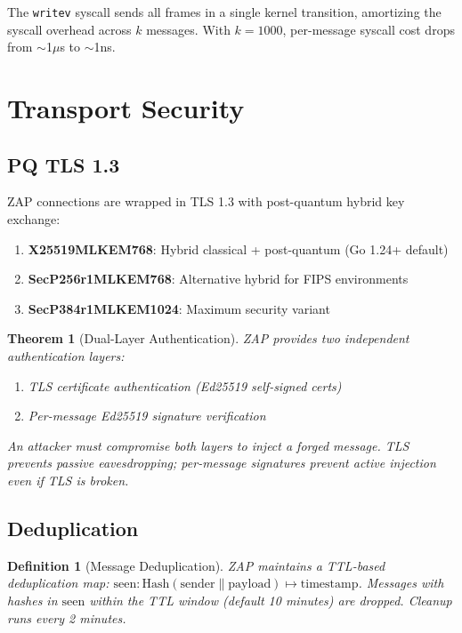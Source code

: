 \documentclass[11pt,letterpaper]{article}
\newtheorem{theorem}{Theorem}
\newtheorem{definition}{Definition}
\begin{document}
The \texttt{writev} syscall sends all frames in a single kernel transition, amortizing the syscall overhead across $k$ messages. With $k = 1000$, per-message syscall cost drops from $\sim$1$\mu$s to $\sim$1ns.

\section{Transport Security}

\subsection{PQ TLS 1.3}

ZAP connections are wrapped in TLS 1.3 with post-quantum hybrid key exchange:

\begin{enumerate}
    \item \textbf{X25519MLKEM768}: Hybrid classical + post-quantum (Go 1.24+ default)
    \item \textbf{SecP256r1MLKEM768}: Alternative hybrid for FIPS environments
    \item \textbf{SecP384r1MLKEM1024}: Maximum security variant
\end{enumerate}

\begin{theorem}[Dual-Layer Authentication]
ZAP provides two independent authentication layers:
\begin{enumerate}
    \item TLS certificate authentication (Ed25519 self-signed certs)
    \item Per-message Ed25519 signature verification
\end{enumerate}
An attacker must compromise both layers to inject a forged message. TLS prevents passive eavesdropping; per-message signatures prevent active injection even if TLS is broken.
\end{theorem}

\subsection{Deduplication}

\begin{definition}[Message Deduplication]
ZAP maintains a TTL-based deduplication map: $\text{seen}: \text{Hash}(\text{sender} \| \text{payload}) \mapsto \text{timestamp}$. Messages with hashes in $\text{seen}$ within the TTL window (default 10 minutes) are dropped. Cleanup runs every 2 minutes.
\end{definition}
\end{document}
